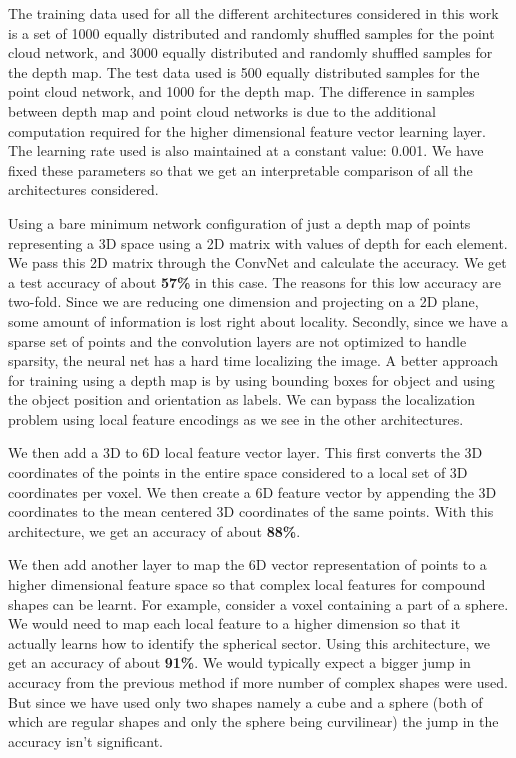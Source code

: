 \documentclass{article}
\begin{document}
The training data used for all the different architectures considered in this work is a set of 1000 equally distributed and randomly shuffled samples for the point cloud network, and 3000 equally distributed and randomly shuffled samples for the depth map. The test data used is 500 equally distributed samples for the point cloud network, and 1000 for the depth map. The difference in samples between depth map and point cloud networks is due to the additional computation required for the higher dimensional feature vector learning layer. The learning rate used is also maintained at a constant value: 0.001. We have fixed these parameters so that we get an interpretable comparison of all the architectures considered.

Using a bare minimum network configuration of just a depth map of points representing a 3D space using a 2D matrix with values of depth for each element. We pass this 2D matrix through the ConvNet and calculate the accuracy. We get a test accuracy of about \textbf{57\%} in this case. The reasons for this low accuracy are two-fold. Since we are reducing one dimension and projecting on a 2D plane, some amount of information is lost right about locality. Secondly, since we have a sparse set of points and the convolution layers are not optimized to handle sparsity, the neural net has a hard time localizing the image. A better approach for training using a depth map is by using bounding boxes for object and using the object position and orientation as labels. We can bypass the localization problem using local feature encodings as we see in the other architectures.

We then add a 3D to 6D local feature vector layer. This first converts the 3D coordinates of the points in the entire space considered to a local set of 3D coordinates per voxel. We then create a 6D feature vector by appending the 3D coordinates to the mean centered 3D coordinates of the same points. With this architecture, we get an accuracy of about \textbf{88\%}.

We then add another layer to map the 6D vector representation of points to a higher dimensional feature space so that complex local features for compound shapes can be learnt. For example, consider a voxel containing a part of a sphere. We would need to map each local feature to a higher dimension so that it actually learns how to identify the spherical sector. Using this architecture, we get an accuracy of about \textbf{91\%}. We would typically expect a bigger jump in accuracy from the previous method if more number of complex shapes were used. But since we have used only two shapes namely a cube and a sphere (both of which are regular shapes and only the sphere being curvilinear) the jump in the accuracy isn’t significant.
\end{document}
